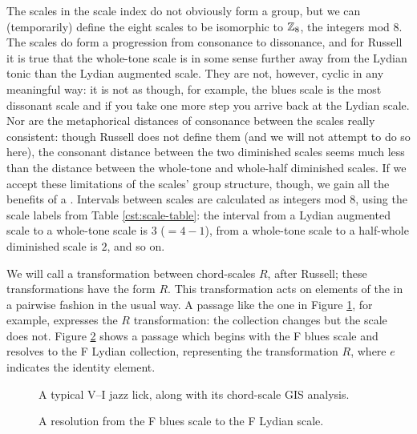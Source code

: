 The scales in the scale index do not obviously form a group, but we can
(temporarily) define the eight scales to be isomorphic to $\mathbb{Z}_8$, the
integers mod 8. The scales do form a progression from consonance to
dissonance, and for Russell it is true that the whole-tone scale is in some
sense further away from the Lydian tonic than the Lydian augmented
scale. They are not, however, cyclic in any meaningful way: it is
not as though, for example, the blues scale is the most dissonant scale and if
you take one more step you arrive back at the Lydian scale. Nor are the
metaphorical distances of consonance between the scales really consistent:
though Russell does not define them (and we will not attempt to do so here), the
consonant distance between the two diminished scales seems much less than the
distance between the whole-tone and whole-half diminished scales.
If we accept these limitations of the scales' group structure, though, we gain
all the benefits of a \gis. Intervals between scales are calculated as
integers mod 8, using the scale labels from Table \ref{cst:scale-table}: the
interval from a Lydian augmented scale to a whole-tone scale is $3$ ($=4-1$),
from a whole-tone scale to a half-whole diminished scale is $2$, and so on.

We will call a transformation between chord-scales $R$, after Russell; these
transformations have the form $R$. This transformation acts on
elements of the \gis in a pairwise fashion in the usual way.
A passage like the one in Figure \ref{cst:gis-fiveone}, for example, expresses the
$R$ transformation: the collection changes but the scale does not.
Figure \ref{cst:gis-blues-lyd} shows a passage which begins with the F blues
scale and resolves to the F Lydian collection, representing the transformation
$R$, where $e$ indicates the identity element.

\begin{figure}[tbp]
  \caption{A typical V--I jazz lick, along with its chord-scale \textsc{GIS}
    analysis.}
  \label{cst:gis-fiveone}
\end{figure}

\begin{figure}[tbp]
  \caption{A resolution from the F blues scale to the F Lydian scale.}
  \label{cst:gis-blues-lyd}
\end{figure}

